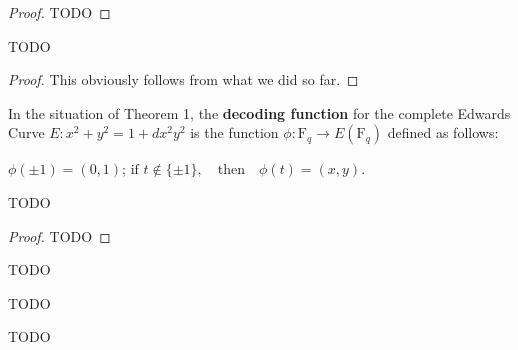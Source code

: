 \begin{proof}
  TODO
\end{proof}

\begin{theorem}
  \label{thm:Elligator1.map_fulfills_curve_equation}
  \leanok
  TODO
\end{theorem}

\begin{proof}
  \leanok
  This obviously follows from what we did so far.
\end{proof}

\begin{definition}
  \label{def:Elligator1.ϕ}
  \leanok
  In the situation of Theorem 1, the \textbf{decoding function} for the complete Edwards Curve $E : x^2 + y^2 = 1 + d x^2 y^2$ is the function $\phi : \text{F}_q \to E(\text{F}_q)$ defined as follows:

  $\phi(\pm 1) = (0, 1)$; $\text{if } t \notin \{\pm 1\}, \quad \text{then} \quad \phi(t) = (x, y)$.
\end{definition}

\begin{theorem}[Preimages of ϕ]
  \label{thm:Elligator1.ϕ_inv_only_two_specific_preimages}
  \leanok
  TODO
\end{theorem}

\begin{proof}
  TODO
\end{proof}

\begin{definition}
  \label{def:Elligator1.E_over_F}
  \leanok
  TODO
\end{definition}

\begin{definition}
  \label{def:Elligator1.ϕ_over_F_prop1}
  \leanok
  TODO
\end{definition}

\begin{definition}
  \label{def:Elligator1.η}
  \leanok
  TODO
\end{definition}

